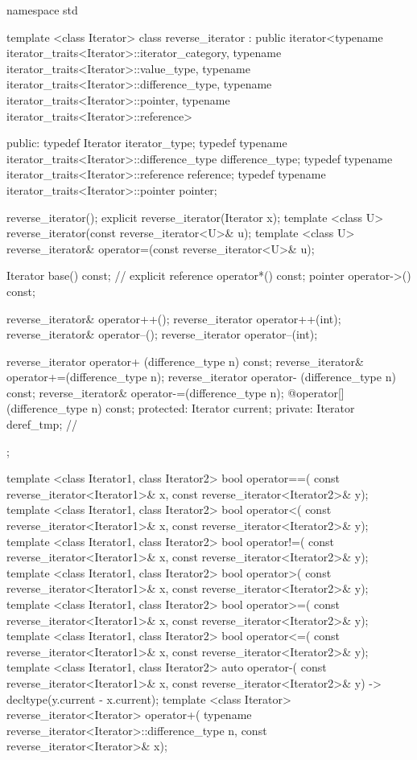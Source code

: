 %
\begin{codeblock}
namespace std {
  template <class Iterator>
  class reverse_iterator : public
        iterator<typename iterator_traits<Iterator>::iterator_category,
        typename iterator_traits<Iterator>::value_type,
        typename iterator_traits<Iterator>::difference_type,
        typename iterator_traits<Iterator>::pointer,
        typename iterator_traits<Iterator>::reference> {
  public:
    typedef Iterator                                            iterator_type;
    typedef typename iterator_traits<Iterator>::difference_type difference_type;
    typedef typename iterator_traits<Iterator>::reference       reference;
    typedef typename iterator_traits<Iterator>::pointer         pointer;

    reverse_iterator();
    explicit reverse_iterator(Iterator x);
    template <class U> reverse_iterator(const reverse_iterator<U>& u);
    template <class U> reverse_iterator& operator=(const reverse_iterator<U>& u);

    Iterator base() const;      // explicit
    reference operator*() const;
    pointer   operator->() const;

    reverse_iterator& operator++();
    reverse_iterator  operator++(int);
    reverse_iterator& operator--();
    reverse_iterator  operator--(int);

    reverse_iterator  operator+ (difference_type n) const;
    reverse_iterator& operator+=(difference_type n);
    reverse_iterator  operator- (difference_type n) const;
    reverse_iterator& operator-=(difference_type n);
    @\unspec@ operator[](difference_type n) const;
  protected:
    Iterator current;
  private:
    Iterator deref_tmp;         // \expos
  };

  template <class Iterator1, class Iterator2>
    bool operator==(
      const reverse_iterator<Iterator1>& x,
      const reverse_iterator<Iterator2>& y);
  template <class Iterator1, class Iterator2>
    bool operator<(
      const reverse_iterator<Iterator1>& x,
      const reverse_iterator<Iterator2>& y);
  template <class Iterator1, class Iterator2>
    bool operator!=(
      const reverse_iterator<Iterator1>& x,
      const reverse_iterator<Iterator2>& y);
  template <class Iterator1, class Iterator2>
    bool operator>(
      const reverse_iterator<Iterator1>& x,
      const reverse_iterator<Iterator2>& y);
  template <class Iterator1, class Iterator2>
    bool operator>=(
      const reverse_iterator<Iterator1>& x,
      const reverse_iterator<Iterator2>& y);
  template <class Iterator1, class Iterator2>
    bool operator<=(
      const reverse_iterator<Iterator1>& x,
      const reverse_iterator<Iterator2>& y);
  template <class Iterator1, class Iterator2>
    auto operator-(
      const reverse_iterator<Iterator1>& x,
      const reverse_iterator<Iterator2>& y) -> decltype(y.current - x.current);
  template <class Iterator>
    reverse_iterator<Iterator> operator+(
      typename reverse_iterator<Iterator>::difference_type n,
      const reverse_iterator<Iterator>& x);
}
\end{codeblock}

